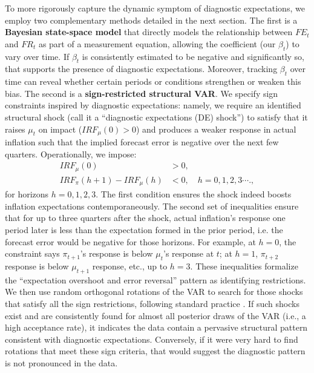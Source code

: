 \documentclass[12pt]{article}
\begin{document}
To more rigorously capture the dynamic symptom of diagnostic expectations, we employ two complementary methods detailed in the next section. The first is a \textbf{Bayesian state-space model} that directly models the relationship between $FE_t$ and $FR_t$ as part of a measurement equation, allowing the coefficient (our $\beta_t$) to vary over time. If $\beta_t$ is consistently estimated to be negative and significantly so, that supports the presence of diagnostic expectations. Moreover, tracking $\beta_t$ over time can reveal whether certain periods or conditions strengthen or weaken this bias. The second is a \textbf{sign-restricted structural VAR}. We specify sign constraints inspired by diagnostic expectations: namely, we require an identified structural shock (call it a “diagnostic expectations (DE) shock”) to satisfy that it raises $\mu_t$ on impact ($IRF_{\mu}(0) > 0$) and produces a weaker response in actual inflation such that the implied forecast error is negative over the next few quarters. Operationally, we impose:
\begin{align*}
    IRF_{\mu}(0)                  & > 0,                               \\
    IRF_{\pi}(h+1) - IRF_{\mu}(h) & < 0, \quad h = 0, 1, 2, 3 \cdots.,
\end{align*}
for horizons $h=0,1,2,3$. The first condition ensures the shock indeed boosts inflation expectations contemporaneously. The second set of inequalities ensure that for up to three quarters after the shock, actual inflation's response one period later is less than the expectation formed in the prior period, i.e. the forecast error would be negative for those horizons. For example, at $h=0$, the constraint says $\pi_{t+1}$'s response is below $\mu_{t}$'s response at $t$; at $h=1$, $\pi_{t+2}$ response is below $\mu_{t+1}$ response, etc., up to $h=3$. These inequalities formalize the “expectation overshoot and error reversal” pattern as identifying restrictions. We then use random orthogonal rotations of the VAR to search for those shocks that satisfy all the sign restrictions, following standard practice \cite{Uhlig2005}. If such shocks exist and are consistently found for almost all posterior draws of the VAR (i.e., a high acceptance rate), it indicates the data contain a pervasive structural pattern consistent with diagnostic expectations. Conversely, if it were very hard to find rotations that meet these sign criteria, that would suggest the diagnostic pattern is not pronounced in the data.
\end{document}

